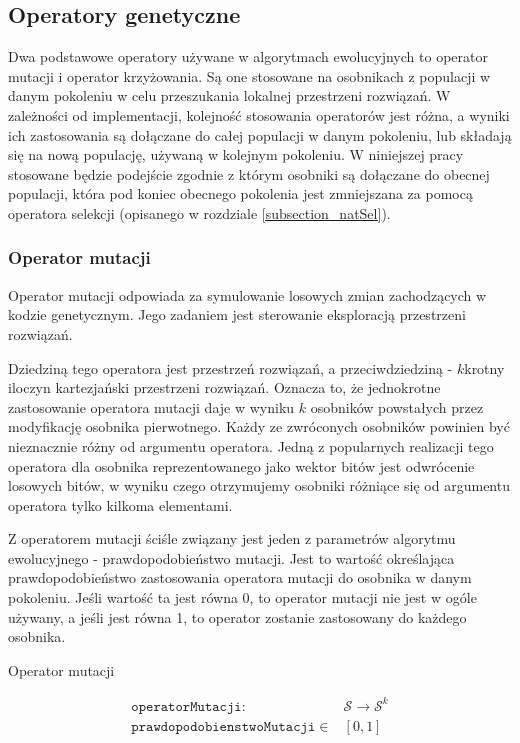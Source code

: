 \documentclass[twoside]{iisthesis}
\newcommand{\important}{\mathcal}
\newcommand{\param}{\mathtt}
\begin{document}
\subsection{Operatory genetyczne}

Dwa podstawowe operatory używane w algorytmach ewolucyjnych to operator mutacji i operator krzyżowania. Są one stosowane na osobnikach z populacji w danym pokoleniu w celu przeszukania lokalnej przestrzeni rozwiązań. W zależności od implementacji, kolejność stosowania operatorów jest różna, a wyniki ich zastosowania są dołączane do całej populacji w danym pokoleniu, lub składają się na nową populację, używaną w kolejnym pokoleniu. W niniejszej pracy stosowane będzie podejście zgodnie z którym osobniki są dołączane do obecnej populacji, która pod koniec obecnego pokolenia jest zmniejszana za pomocą operatora selekcji (opisanego w rozdziale \ref{subsection_natSel}).

\subsubsection{Operator mutacji}
Operator mutacji odpowiada za symulowanie losowych zmian zachodzących w kodzie genetycznym. Jego zadaniem jest sterowanie eksploracją przestrzeni rozwiązań.

Dziedziną tego operatora jest przestrzeń rozwiązań, a przeciwdziedziną - $k$krotny iloczyn kartezjański przestrzeni rozwiązań. Oznacza to, że jednokrotne zastosowanie operatora mutacji daje w wyniku $k$ osobników powstałych przez modyfikację osobnika pierwotnego. Każdy ze zwróconych osobników powinien być nieznacznie różny od argumentu operatora. Jedną z popularnych realizacji tego operatora dla osobnika reprezentowanego jako wektor bitów jest odwrócenie losowych bitów, w wyniku czego otrzymujemy osobniki różniące się od argumentu operatora tylko kilkoma elementami.

Z operatorem mutacji ściśle związany jest jeden z parametrów algorytmu ewolucyjnego - prawdopodobieństwo mutacji. Jest to wartość określająca prawdopodobieństwo zastosowania operatora mutacji do osobnika w danym pokoleniu. Jeśli wartość ta jest równa 0, to operator mutacji nie jest w ogóle używany, a jeśli jest równa 1, to operator zostanie zastosowany do każdego osobnika.

\begin{signature}
	\caption{Operator mutacji \label{signature_mutation}}
	\begin{align}
	\param{operatorMutacji}: &\important{S} \rightarrow \important{S}^k \\
	\param{prawdopodobienstwoMutacji} \in &[0, 1]
	\end{align}
\end{signature}	
\end{document}
